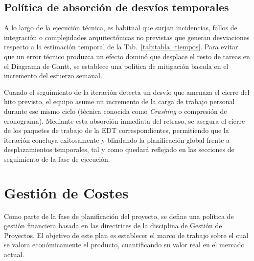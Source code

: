\subsection{Política de absorción de desvíos temporales}
A lo largo de la ejecución técnica, es habitual que surjan incidencias, fallos de integración o complejidades arquitectónicas no previstas que generan desviaciones respecto a la estimación temporal de la Tab.~\ref{tab:tabla_tiempos}. Para evitar que un error técnico produzca un efecto dominó que desplace el resto de tareas en el Diagrama de Gantt, se establece una política de mitigación basada en el incremento del esfuerzo semanal.

Cuando el seguimiento de la iteración detecta un desvío que amenaza el cierre del hito previsto, el equipo asume un incremento de la carga de trabajo personal durante ese mismo ciclo (técnica conocida como \textit{Crashing} o compresión de cronograma). Mediante esta absorción inmediata del retraso, se asegura el cierre de los paquetes de trabajo de la EDT correspondientes, permitiendo que la iteración concluya exitosamente y blindando la planificación global frente a desplazamientos temporales, tal y como quedará reflejado en las secciones de seguimiento de la fase de ejecución.

\section{Gestión de Costes}

Como parte de la fase de planificación del proyecto, se define una política de gestión financiera basada en las directrices de la disciplina de Gestión de Proyectos. El objetivo de este plan es establecer el marco de trabajo sobre el cual se valora económicamente el producto, cuantificando su valor real en el mercado actual.

